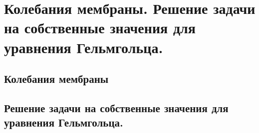 \chapter{Колебания мембраны. Решение задачи на собственные значения для
уравнения Гельмгольца.}

\section{Колебания мембраны}
\section{Решение задачи на собственные значения для уравнения Гельмгольца.}